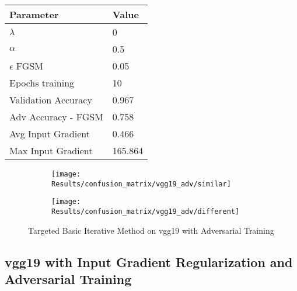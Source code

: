 \documentclass[draft,final]{vutinfth} %
\begin{document}
\begin{table}[h]
  \centering
  \begin{tabular}{ll}
    \toprule
			Parameter			& Value   \\
    \midrule
			$\lambda$								& 0				\\
			$\alpha$								& 0.5			\\
			$\epsilon$ FGSM					& 0.05		\\
			Epochs training					& 10			\\
			
			Validation Accuracy			& 0.967		\\ 
			Adv Accuracy - FGSM			& 0.758		\\
			
			Avg Input Gradient			& 0.466	\\
			Max Input Gradient			& 165.864\\
    \bottomrule
  \end{tabular}
\end{table}


\begin{figure}[h]
  \begin{subfigure}[b]{0.5\columnwidth}
		\centering
    \texttt{[image: Results/confusion\_matrix/vgg19\_adv/similar]}
    \label{fig:exp:cm:vgg19_adv:similar}
  \end{subfigure}
  \begin{subfigure}[b]{0.5\columnwidth}
		\centering
    \texttt{[image: Results/confusion\_matrix/vgg19\_adv/different]}
    \label{fig:exp:cm:vgg19_adv:different}
  \end{subfigure}
  \caption{Targeted Basic Iterative Method on vgg19 with Adversarial Training}
  \label{fig:exp:cm:vgg19_adv}
\end{figure}
\clearpage

\subsection{vgg19 with Input Gradient Regularization and Adversarial Training}
\end{document}
